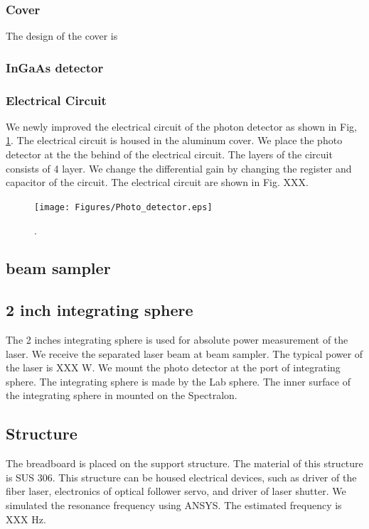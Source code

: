 \subsubsection{Cover}
The design of the cover is 
\subsubsection{InGaAs detector}
\subsubsection{Electrical Circuit}
We newly improved the electrical circuit of the photon detector as shown in Fig, \ref{fig:Photo_detector}. The electrical circuit is housed in the aluminum cover. We place the photo detector at the the behind of the electrical circuit. The layers of the circuit consists of 4 layer. We change the differential gain by changing the register and capacitor of the circuit. The electrical circuit are shown in Fig. XXX.
\begin{figure}
\begin{center}
\texttt{[image: Figures/Photo\_detector.eps]}
\caption{.} 
\label{fig:Photo_detector} 
\end{center}
\end{figure}

\subsection{beam sampler}
\subsection{2 inch integrating sphere}
The 2 inches integrating sphere is used for absolute power measurement of the laser. We receive the separated laser beam at beam sampler. The typical power of the laser is XXX W. We mount the photo detector at the port of integrating sphere. The integrating sphere is made by the Lab sphere. The inner surface of the integrating sphere in mounted on the Spectralon.

\subsection{Structure}
The breadboard is placed on the support structure. The material of this structure is SUS 306. This structure can be housed electrical devices, such as driver of the fiber laser, electronics of optical follower servo, and driver of laser shutter. We simulated the resonance frequency using ANSYS. The estimated frequency is XXX Hz.

